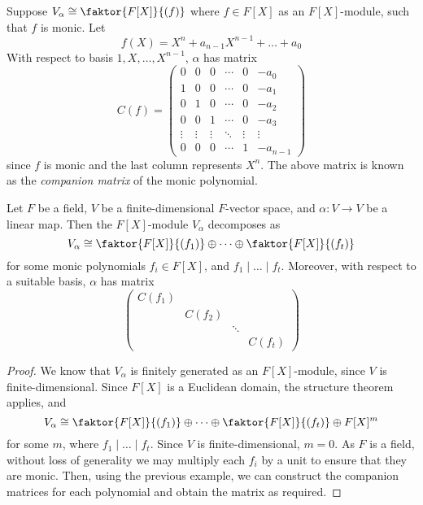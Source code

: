 \begin{example}
	Suppose \( V_\alpha \cong \faktor{F[X]}{(f)} \) where \( f \in F[X] \) as an \( F[X] \)-module, such that \( f \) is monic.
	Let
	\[ f(X) = X^n + a_{n-1} X^{n-1} + \dots + a_0 \]
	With respect to basis \( 1, X, \dots, X^{n-1} \), \( \alpha \) has matrix
	\[
		C(f) =
		\begin{pmatrix}
			0 & 0 & 0 & \cdots & 0 & -a_0 \\
			1 & 0 & 0 & \cdots & 0 & -a_1 \\
			0 & 1 & 0 & \cdots & 0 & -a_2 \\
			0 & 0 & 1 & \cdots & 0 & -a_3 \\
			\vdots & \vdots & \vdots & \ddots & \vdots & \vdots \\
			0 & 0 & 0 & \cdots & 1 & -a_{n-1}
		\end{pmatrix}
	\]
	since \( f \) is monic and the last column represents \( X^n \).
	The above matrix is known as the \textit{companion matrix} of the monic polynomial.
\end{example}
\begin{theorem}
	Let \( F \) be a field, \( V \) be a finite-dimensional \( F \)-vector space, and \( \alpha \colon V \to V \) be a linear map.
	Then the \( F[X] \)-module \( V_\alpha \) decomposes as
	\[ V_\alpha \cong \faktor{F[X]}{(f_1)} \oplus \dots \oplus \faktor{F[X]}{(f_t)} \]
	for some monic polynomials \( f_i \in F[X] \), and \( f_1 \mid \dots \mid f_t \).
	Moreover, with respect to a suitable basis, \( \alpha \) has matrix
	\begin{equation}
		\begin{pmatrix}
			C(f_1) \\
			& C(f_2) \\
			&& \ddots \\
			&&& C(f_t)
		\end{pmatrix}
		\tag{\(\ast\ast\)}
	\end{equation}
\end{theorem}
\begin{proof}
	We know that \( V_\alpha \) is finitely generated as an \( F[X] \)-module, since \( V \) is finite-dimensional.
	Since \( F[X] \) is a Euclidean domain, the structure theorem applies, and
	\[ V_\alpha \cong \faktor{F[X]}{(f_1)} \oplus \dots \oplus \faktor{F[X]}{(f_t)} \oplus F[X]^m \]
	for some \( m \), where \( f_1 \mid \dots \mid f_t \).
	Since \( V \) is finite-dimensional, \( m = 0 \).
	As \( F \) is a field, without loss of generality we may multiply each \( f_i \) by a unit to ensure that they are monic.
	Then, using the previous example, we can construct the companion matrices for each polynomial and obtain the matrix as required.
\end{proof}
